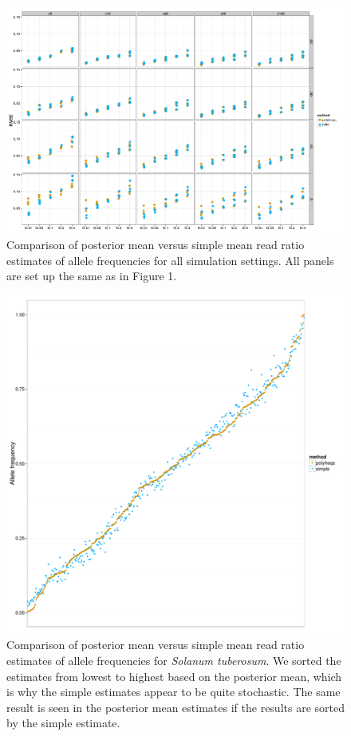 \documentclass[]{article}
\newcommand{\beginsupplement}{%
        \setcounter{table}{0}
        \renewcommand{\thetable}{S\arabic{table}}%
        \setcounter{figure}{0}
        \renewcommand{\thefigure}{S\arabic{figure}}%
     }
\begin{document}
\beginsupplement

\begin{figure}[b]
\centering
\includegraphics[width=\textwidth]{pdf/figS1}
\caption{Comparison of posterior mean versus simple mean read ratio estimates of allele frequencies for all simulation settings. All panels are set up the same as in Figure 1.}
\end{figure}



\begin{figure}[b]
\centering
\includegraphics[width=\textwidth]{pdf/figS2}
\caption{Comparison of posterior mean versus simple mean read ratio estimates of allele frequencies for \textit{Solanum tuberosum}. We sorted the estimates from lowest to highest based on the posterior mean, which is why the simple estimates appear to be quite stochastic. The same result is seen in the posterior mean estimates if the results are sorted by the simple estimate.}
\end{figure}
\end{document}
